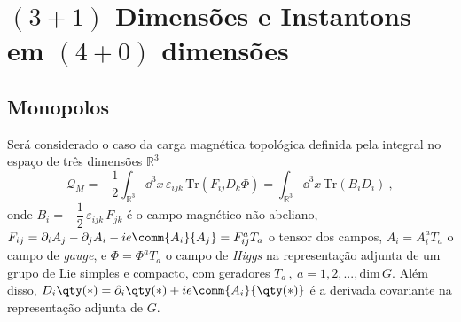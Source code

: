\chapter[$(3+1)$ Dimensões e Instantons em $(4+0)$ dimensões]{$(3+1)$ Dimensões e Instantons em $(4+0)$ dimensões}
\label{(3+1) e 4}

\section{Monopolos}

Será considerado o caso da carga magnética topológica definida pela integral no espaço de três dimensões $\mathbb{R}^3$
\begin{equation}
    \mathcal{Q}_M = -\dfrac{1}{2}\int_{\mathbb{R}^3} \dd^3x \, \varepsilon_{ijk} \, \text{Tr}\left(F_{ij}D_k\Phi \right) = \int_{\mathbb{R}^3} \dd^3x \, \text{Tr}\left(B_i D_i \right) \ ,
    \label{Qmonopolo}
\end{equation}
onde $B_i = -\dfrac{1}{2}\, \varepsilon_{ijk}\, F_{jk}$ é o campo magnético não abeliano, $F_{ij} = \partial_iA_j - \partial_j A_i - ie\comm{A_i}{A_j} = F^a_{ij} T_a$ o tensor dos campos, $A_i = A_i^a T_a$ o campo de \textit{gauge}, e $\Phi = \Phi^{a}T_a$ o campo de \textit{Higgs} na representação adjunta de um grupo de Lie simples e compacto, com geradores $T_a \, , \ a = 1,2,...,\text{dim} \, G$. Além disso, $D_i \qty(*) = \partial_i \qty(*) + ie \comm{A_i}{\qty(*)} $ é a derivada covariante na representação adjunta de $G$.

